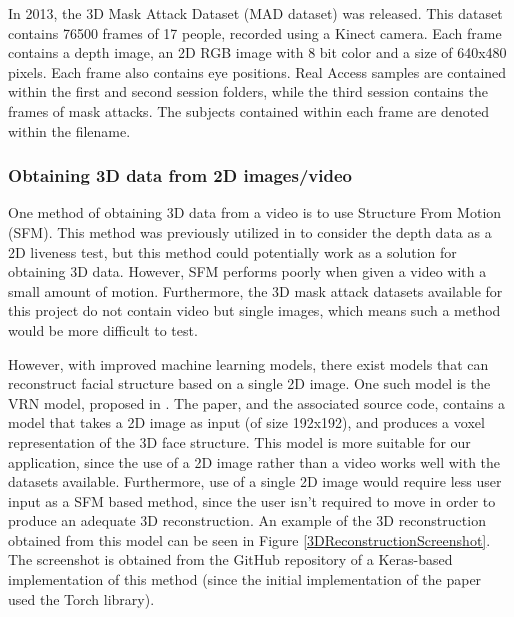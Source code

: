 \documentclass[10pt,a4paper]{article}
\begin{document}
        In 2013, the 3D Mask Attack Dataset (MAD dataset) was released. This dataset contains 76500 frames of 17 people, recorded using a Kinect camera.
        Each frame contains a depth image, an 2D RGB image with 8 bit color and a size of 640x480 pixels. Each frame also contains eye positions.
        Real Access samples are contained within the first and second session folders, while the third session contains the frames of mask attacks. The subjects contained
        within each frame are denoted within the filename.
        
        \cite{3DMadDataset}

        \subsubsection{Obtaining 3D data from 2D images/video}
            One method of obtaining 3D data from a video is to use Structure From Motion (SFM). This method was previously utilized in \cite{SFMClassifier} to consider the depth data as a 2D liveness test,
            but this method could potentially work as a solution for obtaining 3D data. However, SFM performs poorly when given a video with a small amount of motion. Furthermore, the 3D mask attack datasets
            available for this project do not contain video but single images, which means such a method would be more difficult to test.

            However, with improved machine learning models, there exist models that can reconstruct facial structure based on a single 2D image. One such model is the VRN model, proposed in \cite{3DReconstructionMethod}.
            The paper, and the associated source code, contains a model that takes a 2D image as input (of size 192x192), and produces a voxel representation of the 3D face structure. This model is more suitable for our
            application, since the use of a 2D image rather than a video works well with the datasets available. Furthermore, use of a single 2D image would require less user input as a SFM based method, since the user isn't required
            to move in order to produce an adequate 3D reconstruction. An example of the 3D reconstruction obtained from this model can be seen in Figure \ref{3DReconstructionScreenshot}. The screenshot is obtained from the GitHub repository
            of a Keras-based implementation of this method (since the initial implementation of the paper used the Torch library).
\end{document}
